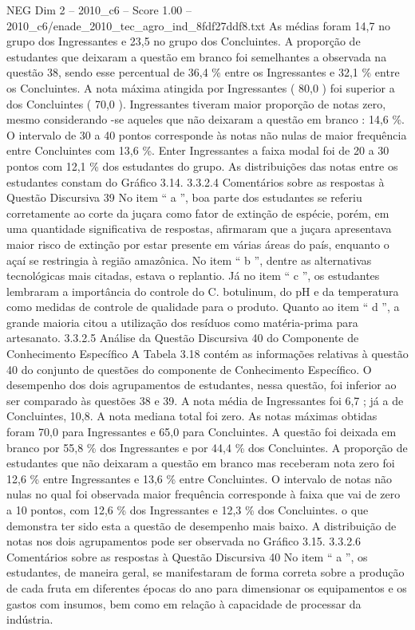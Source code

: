 \begin{textsample}{NEG Dim 2 – 2010\_c6 – Score 1.00 – 2010\_c6/enade\_2010\_tec\_agro\_ind\_8fdf27ddf8.txt}
As médias foram 14,7 no grupo dos Ingressantes e 23,5 no grupo dos Concluintes.
A proporção de estudantes que deixaram a questão em branco foi semelhantes a observada na questão 38, sendo esse percentual de 36,4 \% entre os Ingressantes e 32,1 \% entre os Concluintes.
A nota máxima atingida por Ingressantes ( 80,0 ) foi superior a dos Concluintes ( 70,0 ).
Ingressantes tiveram maior proporção de notas zero, mesmo considerando -se aqueles que não deixaram a questão em branco : 14,6 \%.
O intervalo de 30 a 40 pontos corresponde às notas não nulas de maior frequência entre Concluintes com 13,6 \%.
Enter Ingressantes a faixa modal foi de 20 a 30 pontos com 12,1 \% dos estudantes do grupo.
As distribuições das notas entre os estudantes constam do Gráfico 3.14. 3.3.2.4 Comentários sobre as respostas à Questão Discursiva 39 No item “ a ”, boa parte dos estudantes se referiu corretamente ao corte da juçara como fator de extinção de espécie, porém, em uma quantidade significativa de respostas, afirmaram que a juçara apresentava maior risco de extinção por estar presente em várias áreas do país, enquanto o açaí se restringia à região amazônica.
No item “ b ”, dentre as alternativas tecnológicas mais citadas, estava o replantio.
Já no item “ c ”, os estudantes lembraram a importância do controle do C. botulinum, do pH e da temperatura como medidas de controle de qualidade para o produto.
Quanto ao item “ d ”, a grande maioria citou a utilização dos resíduos como matéria-prima para artesanato. 3.3.2.5 Análise da Questão Discursiva 40 do Componente de Conhecimento Específico A Tabela 3.18 contém as informações relativas à questão 40 do conjunto de questões do componente de Conhecimento Específico.
O desempenho dos dois agrupamentos de estudantes, nessa questão, foi inferior ao ser comparado às questões 38 e 39.
A nota média de Ingressantes foi 6,7 ; já a de Concluintes, 10,8.
A nota mediana total foi zero.
As notas máximas obtidas foram 70,0 para Ingressantes e 65,0 para Concluintes.
A questão foi deixada em branco por 55,8 \% dos Ingressantes e por 44,4 \% dos Concluintes.
A proporção de estudantes que não deixaram a questão em branco mas receberam nota zero foi 12,6 \% entre Ingressantes e 13,6 \% entre Concluintes.
O intervalo de notas não nulas no qual foi observada maior frequência corresponde à faixa que vai de zero a 10 pontos, com 12,6 \% dos Ingressantes e 12,3 \% dos Concluintes. o que demonstra ter sido esta a questão de desempenho mais baixo.
A distribuição de notas nos dois agrupamentos pode ser observada no Gráfico 3.15. 3.3.2.6 Comentários sobre as respostas à Questão Discursiva 40 No item “ a ”, os estudantes, de maneira geral, se manifestaram de forma correta sobre a produção de cada fruta em diferentes épocas do ano para dimensionar os equipamentos e os gastos com insumos, bem como em relação à capacidade de processar da indústria.

\end{textsample}

